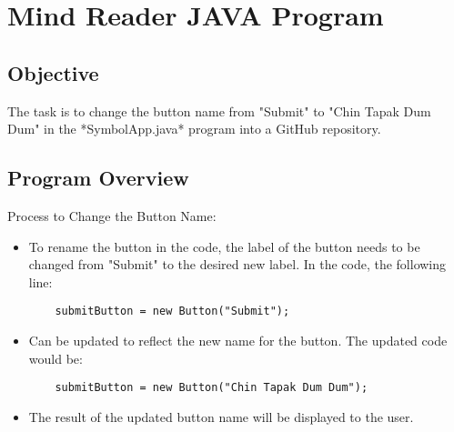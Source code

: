 \section{Mind Reader JAVA Program}
\subsection{Objective}
The task is to change the button name from "Submit" to "Chin Tapak Dum Dum" in the *SymbolApp.java* program into a GitHub repository.

\subsection{Program Overview}
Process to Change the Button Name:
\begin{itemize}
    \item To rename the button in the code, the label of the button needs to be changed from "Submit" to the desired new label. In the code, the following line:
    \begin{verbatim}
    submitButton = new Button("Submit");
    \end{verbatim}
    \item Can be updated to reflect the new name for the button. The updated code would be:
    \begin{verbatim}
    submitButton = new Button("Chin Tapak Dum Dum");
    \end{verbatim}
    \item The result of the updated button name will be displayed to the user.
\end{itemize}

